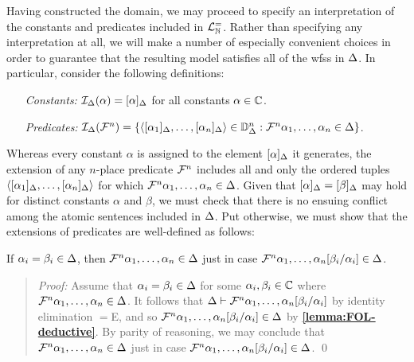 Having constructed the domain, we may proceed to specify an interpretation of the constants and predicates included in $\mathcal{L}^{=}_{\mathbb{N}}$.
Rather than specifying any interpretation at all, we will make a number of especially convenient choices in order to guarantee that the resulting model satisfies all of the wfss in $\Delta$.
In particular, consider the following definitions:
  \begin{enumerate}[leftmargin=1.5in]
    \item[\it Constants:] $\mathcal{I}_{\Delta}(\alpha)=[\alpha]_{\Delta}$ for all constants $\alpha\in\mathbb{C}$. 
    \item[\it Predicates:] $\mathcal{I}_{\Delta}(\mathcal{F}^n)=\lbrace\langle[\alpha_1]_{\Delta},\ldots,[\alpha_n]_{\Delta}\rangle\in\mathbb{D}_{\Delta}^n:\mathcal{F}^n\alpha_1,\ldots,\alpha_n\in\Delta\rbrace$.
  \end{enumerate}
Whereas every constant $\alpha$ is assigned to the element $[\alpha]_{\Delta}$ it generates, the extension of any $n$-place predicate $\mathcal{F}^n$ includes all and only the ordered tuples $\langle[\alpha_1]_{\Delta},\ldots,[\alpha_n]_{\Delta}\rangle$ for which $\mathcal{F}^n\alpha_1,\ldots,\alpha_n\in\Delta$.
Given that $[\alpha]_{\Delta}=[\beta]_{\Delta}$ may hold for distinct constants $\alpha$ and $\beta$, we must check that there is no ensuing conflict among the atomic sentences included in $\Delta$.
Put otherwise, we must show that the extensions of predicates are well-defined as follows:





\begin{Lthm} \label{lemma:FOL-preddef}
  If $\alpha_i=\beta_i\in\Delta$, then $\mathcal{F}^n\alpha_1,\ldots,\alpha_n\in\Delta$ just in case $\mathcal{F}^n\alpha_1,\ldots,\alpha_n[\beta_i/\alpha_i]\in\Delta$.
\end{Lthm}

\begin{quote} 
  \textit{Proof:} 
  Assume that $\alpha_i=\beta_i\in\Delta$ for some $\alpha_i,\beta_i\in\mathbb{C}$ where $\mathcal{F}^n\alpha_1,\ldots,\alpha_n\in\Delta$.
  It follows that $\Delta\vdash\mathcal{F}^n\alpha_1,\ldots,\alpha_n[\beta_i/\alpha_i]$ by identity elimination $=$E, and so $\mathcal{F}^n\alpha_1,\ldots,\alpha_n[\beta_i/\alpha_i]\in\Delta$ by \textbf{\ref{lemma:FOL-deductive}}.
  By parity of reasoning, we may conclude that $\mathcal{F}^n\alpha_1,\ldots,\alpha_n\in\Delta$ just in case $\mathcal{F}^n\alpha_1,\ldots,\alpha_n[\beta_i/\alpha_i]\in\Delta$.
  \qed
\end{quote}


